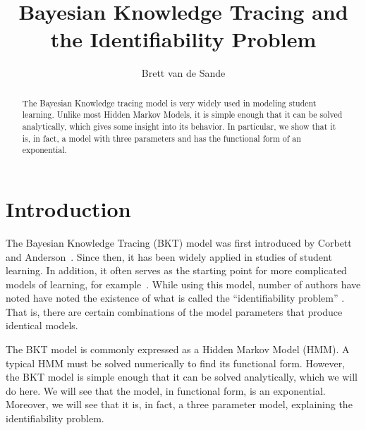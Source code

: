 \documentclass[11pt,letterpaper]{article}
\begin{document}


\title{Bayesian Knowledge Tracing and the Identifiability Problem}
\author{Brett van de Sande}

\maketitle

\begin{abstract}
The Bayesian Knowledge tracing model is very widely used in
modeling student learning.  Unlike most Hidden Markov Models,
it is simple enough that it can be solved analytically, which
gives some insight into its behavior.  In particular, we show that
it is, in fact, a model with three parameters and has the 
functional form of an exponential.
\end{abstract}

%
%


\section{Introduction}

The Bayesian Knowledge Tracing (BKT) model was first introduced by Corbett
and Anderson~\cite{corbett_knowledge_1994}.  Since then, it has been widely applied
in studies of student learning.  In addition, it often serves as the starting
%
%
point for more complicated models of learning, for example~\cite{baker_r._improving_2008,lee_impact_2012}.  
While using this model,  number of authors have noted have noted the 
existence of what is called the ``identifiability problem'' \cite{beck_identifiability:_2007}.    
That is, there are certain combinations of the model 
parameters that produce identical models.   

The BKT model is commonly expressed as a Hidden Markov Model (HMM).
A typical HMM must be solved numerically to find its functional form.
However, the BKT model is simple enough that it can be solved analytically,
which we will do here.  We will see that the model, in functional
form, is an exponential.  Moreover, we will see that it is, in fact,
a three parameter model, explaining the identifiability problem.
\end{document}
